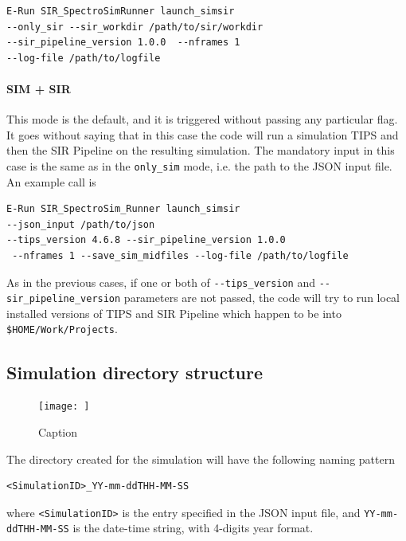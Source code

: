 \begin{verbatim}
E-Run SIR_SpectroSimRunner launch_simsir 
--only_sir --sir_workdir /path/to/sir/workdir
--sir_pipeline_version 1.0.0  --nframes 1
--log-file /path/to/logfile
\end{verbatim}

\paragraph{SIM + SIR}
This mode is the default, and it is triggered without passing any particular flag. It goes without saying that in this case the code will run a simulation TIPS and then the SIR Pipeline on the resulting simulation. The mandatory input in this case is the same as in the \verb+only_sim+ mode, i.e. the path to the JSON input file. An example call is

\begin{verbatim}
E-Run SIR_SpectroSim_Runner launch_simsir 
--json_input /path/to/json
--tips_version 4.6.8 --sir_pipeline_version 1.0.0
 --nframes 1 --save_sim_midfiles --log-file /path/to/logfile
\end{verbatim}

As in the previous cases, if one or both of \verb+--tips_version+ and \verb+--sir_pipeline_version+ parameters are not passed, the code will try to run local installed versions of TIPS and SIR Pipeline which happen to be into \verb+$HOME/Work/Projects+.

\subsection{Simulation directory structure}

\begin{figure}
    \centering
    \texttt{[image: ]}
    \caption{Caption}
    \label{fig:my_label}
\end{figure}

The directory created for the simulation will have the following naming pattern

\begin{verbatim}
<SimulationID>_YY-mm-ddTHH-MM-SS
\end{verbatim}

where \verb+<SimulationID>+ is the entry specified in the JSON input file, and \verb+YY-mm-ddTHH-MM-SS+ is the date-time string, with 4-digits year format.
